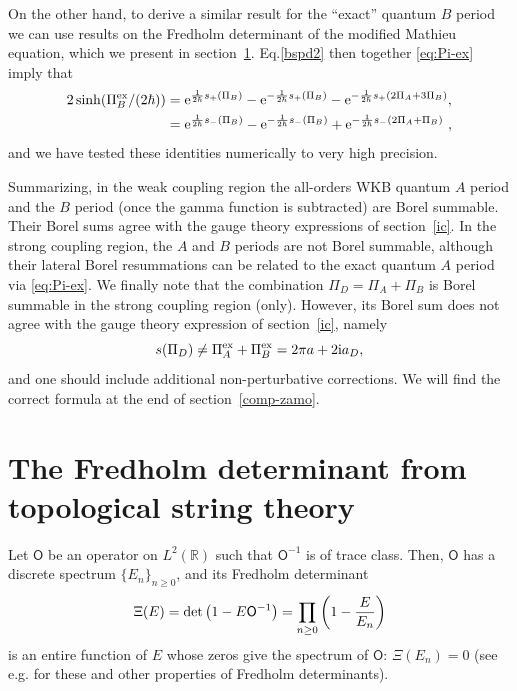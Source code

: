 \documentclass[a4paper,11pt]{article}
\theoremstyle{definition}
\def\IR{{\mathbb R}}
\newcommand{\re}{{\rm e}}
\newcommand{\ri}{{\rm i}}
\newcommand{\mO}{\mathsf{O}}
\newcommand{\be}{\begin{equation}}
\newcommand{\ee}{\end{equation}}
\def\IR{\mathbb{R}}
\begin{document}
On the other hand, to derive a similar result for the ``exact''
quantum $B$ period we can use results on the Fredholm determinant of
the modified Mathieu equation, which we present in
section~\ref{tssst}. Eq.\eqref{bspd2} then together \eqref{eq:Pi-ex}
imply that
\begin{equation}\label{eq:Pi-ex-2}
\begin{aligned}
  2\sinh(\Pi^{\text{ex}}_B/(2\hbar))
  &= \re^{\frac{1}{2\hbar} s_+(\Pi_B)}-\re^{-\frac{1}{2\hbar}
    s_+(\Pi_B)}
    - \re^{-\frac{1}{2\hbar} s_+(2\Pi_A+3\Pi_B)}, \\
  &= \re^{\frac{1}{2\hbar} s_-(\Pi_B)}-\re^{-\frac{1}{2\hbar} s_-(\Pi_B)}
    +\re^{-\frac{1}{2\hbar} s_-(2\Pi_A+\Pi_B)} \ ,
  \end{aligned}
\end{equation}
and we have tested these identities numerically to very high
precision.

Summarizing, in the weak coupling region the all-orders WKB quantum $A$
period and the $B$ period (once the gamma function is subtracted) are
Borel summable. Their Borel sums agree with the gauge theory
expressions of section~\ref{ic}. In the strong coupling region, the $A$ and
$B$ periods are not Borel summable, although their lateral Borel resummations can
be related to the exact quantum $A$ period via \eqref{eq:Pi-ex}. We
finally note that the combination $\Pi_D=\Pi_A+\Pi_B$ is Borel
summable in the strong coupling region (only). However, its Borel sum
does not agree with the gauge theory expression of section~\eqref{ic},
namely
%
\begin{equation}
s(\Pi_D)\neq  \Pi_A^{\rm ex}+\Pi_B^{\rm ex}= 2 \pi a+2 \ri a_D, 
\end{equation}
%
and one should include additional non-perturbative corrections.  We
will find the correct formula at the end of section~\ref{comp-zamo}.

\section{The Fredholm determinant from topological string theory} \label{tssst}


Let $\mO$ be an operator on $L^2(\IR)$ such that $\mO^{-1}$ is of trace class. Then, $\mO$ has a discrete spectrum $\{E_n\}_{n\geq 0}$, and its Fredholm determinant 
% 
\be
\label{fdm} \Xi(E)={\rm det}\left(1-E \mO^{-1} \right) =\prod_{n\geq0}\left({1-{E \over E_n}}\right)
 \ee
%
is an entire function of $E$ whose zeros give the spectrum of $\mO$: $\Xi(E_n)=0$ (see e.g. \cite{simon-paper} for these and other properties of Fredholm determinants). 
\end{document}
